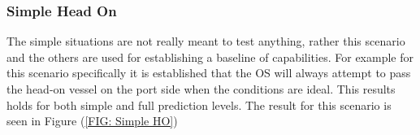 

\subsubsection{Simple Head On}
The simple situations are not really meant to test anything, rather this scenario and the others are used for establishing
a baseline of capabilities. For example for this scenario specifically it is established that the OS will always attempt to
pass the head-on vessel on the port side when the conditions are ideal. This results holds for both simple and
full prediction levels. The result for this scenario is seen in Figure (\ref{FIG: Simple HO})

